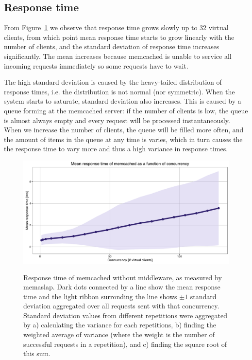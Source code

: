 \documentclass[11pt]{article}
\begin{document}
\subsection{Response time}\label{sec:baseline:rt}

From Figure~\ref{fig:baseline:responsetime} we observe that response time grows slowly up to 32 virtual clients, from which point mean response time starts to grow linearly with the number of clients, and the standard deviation of response time increases significantly. The mean increases because memcached is unable to service all incoming requests immediately so some requests have to wait.

The high standard deviation is caused by the heavy-tailed distribution of response times, i.e. the distribution is not normal (nor symmetric). When the system starts to saturate, standard deviation also increases. This is caused by a queue forming at the memcached server: if the number of clients is low, the queue is almost always empty and every request will be processed instantaneously. When we increase the number of clients, the queue will be filled more often, and the amount of items in the queue at any time is varies, which in turn causes the the response time to vary more and thus a high variance in response times.

\begin{figure}[p]
\centering
\includegraphics[width=\textwidth]{../results/baseline/graphs/responsetime.pdf}
\label{fig:baseline:responsetime}
\caption{Response time of memcached without middleware, as measured by memaslap. Dark dots connected by a line show the mean response time and the light ribbon surronding the line shows $\pm 1$ standard deviation aggregated over all requests sent with that concurrency. Standard deviation values from different repetitions were aggregated by a) calculating the variance for each repetitions, b) finding the weighted average of variance (where the weight is the number of successful requests in a repetition), and c) finding the square root of this sum. }
\end{figure}
\end{document}
